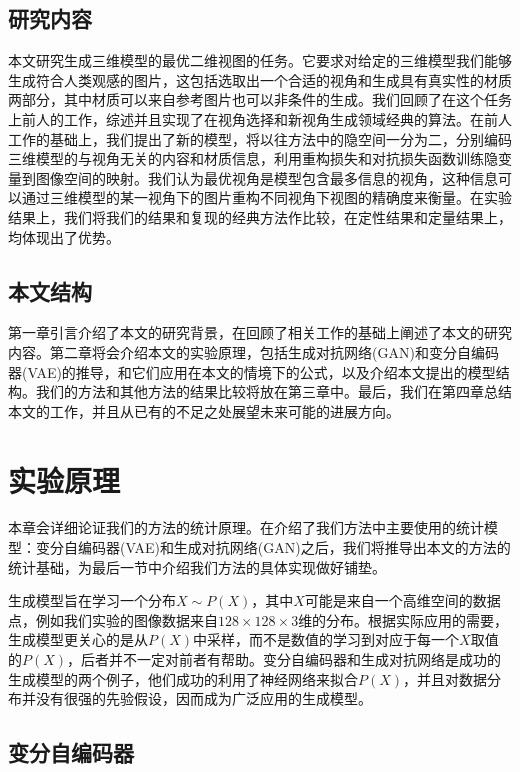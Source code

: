 \documentclass[UTF8,openany,AutoFakeBold,AutoFakeSlant,cs4size]{ctexbook}
\begin{document}
\section{研究内容}

本文研究生成三维模型的最优二维视图的任务。它要求对给定的三维模型我们能够生成符合人类观感的图片，这包括选取出一个合适的视角和生成具有真实性的材质两部分，其中材质可以来自参考图片也可以非条件的生成。我们回顾了在这个任务上前人的工作，综述并且实现了在视角选择和新视角生成领域经典的算法。在前人工作的基础上，我们提出了新的模型，将以往方法中的隐空间一分为二，分别编码三维模型的与视角无关的内容和材质信息，利用重构损失和对抗损失函数训练隐变量到图像空间的映射。我们认为最优视角是模型包含最多信息的视角，这种信息可以通过三维模型的某一视角下的图片重构不同视角下视图的精确度来衡量。在实验结果上，我们将我们的结果和复现的经典方法作比较，在定性结果和定量结果上，均体现出了优势。

\section{本文结构}

第一章引言介绍了本文的研究背景，在回顾了相关工作的基础上阐述了本文的研究内容。第二章将会介绍本文的实验原理，包括生成对抗网络(GAN)和变分自编码器(VAE)的推导，和它们应用在本文的情境下的公式，以及介绍本文提出的模型结构。我们的方法和其他方法的结果比较将放在第三章中。最后，我们在第四章总结本文的工作，并且从已有的不足之处展望未来可能的进展方向。



\clearpage

\chapter{实验原理}

本章会详细论证我们的方法的统计原理。在介绍了我们方法中主要使用的统计模型：变分自编码器(VAE)\cite{kingma2014autoencoding}和生成对抗网络(GAN)\cite{NIPS2014_5423}之后，我们将推导出本文的方法的统计基础，为最后一节中介绍我们方法的具体实现做好铺垫。

生成模型旨在学习一个分布$X \sim P(X)$，其中$X$可能是来自一个高维空间的数据点，例如我们实验的图像数据来自$128 \times 128 \times 3$维的分布。根据实际应用的需要，生成模型更关心的是从$P(X)$中采样，而不是数值的学习到对应于每一个$X$取值的$P(X)$，后者并不一定对前者有帮助。变分自编码器和生成对抗网络是成功的生成模型的两个例子，他们成功的利用了神经网络来拟合$P(X)$，并且对数据分布并没有很强的先验假设，因而成为广泛应用的生成模型。

\section{变分自编码器}
\end{document}
